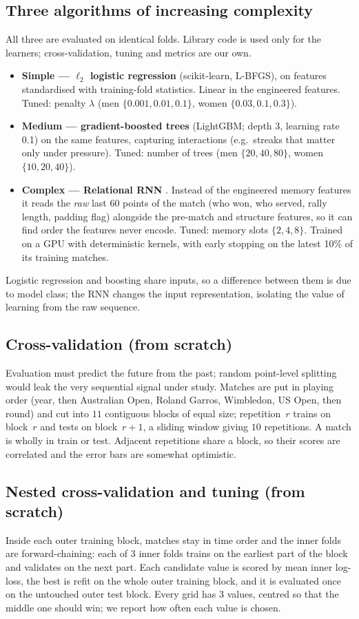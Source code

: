 \documentclass[10pt,a4paper]{article}
\begin{document}
\subsection{Three algorithms of increasing complexity}
All three are evaluated on identical folds. Library code is used only for the
learners; cross-validation, tuning and metrics are our own.
\begin{itemize}
\item \textbf{Simple --- $\ell_2$ logistic regression} (scikit-learn, L-BFGS),
on features standardised with training-fold statistics. Linear in the engineered
features. Tuned: penalty $\lambda$ (men $\{0.001,0.01,0.1\}$, women
$\{0.03,0.1,0.3\}$).
\item \textbf{Medium --- gradient-boosted trees} (LightGBM; depth 3, learning
rate 0.1) on the same features, capturing interactions (e.g.\ streaks that matter
only under pressure). Tuned: number of trees (men $\{20,40,80\}$, women
$\{10,20,40\}$).
\item \textbf{Complex --- Relational RNN} \cite{santoro2018}. Instead of the
engineered memory features it reads the \emph{raw} last 60 points of the match
(who won, who served, rally length, padding flag) alongside the pre-match and
structure features, so it can find order the features never encode. Tuned:
memory slots $\{2,4,8\}$. Trained on a GPU with deterministic kernels, with
early stopping on the latest 10\% of its training matches.
\end{itemize}
Logistic regression and boosting share inputs, so a difference between them is
due to model class; the RNN changes the input representation, isolating the
value of learning from the raw sequence.

\subsection{Cross-validation (from scratch)}
Evaluation must predict the future from the past; random point-level splitting
would leak the very sequential signal under study. Matches are put in playing
order (year, then Australian Open, Roland Garros, Wimbledon, US Open, then
round) and cut into $11$ contiguous blocks of equal size; repetition~$r$ trains
on block~$r$ and tests on block~$r{+}1$, a sliding window giving $10$
repetitions. A match is wholly in train or test. Adjacent repetitions share a
block, so their scores are correlated and the error bars are somewhat optimistic.

\subsection{Nested cross-validation and tuning (from scratch)}
Inside each outer training block, matches stay in time order and the inner folds
are forward-chaining: each of $3$ inner folds trains on the earliest part of the
block and validates on the next part. Each candidate value is scored by mean
inner log-loss, the best is refit on the whole outer training block, and it is
evaluated once on the untouched outer test block. Every grid has $3$ values,
centred so that the middle one should win; we report how often each value is
chosen.
\end{document}

